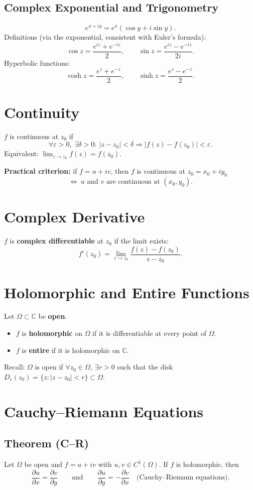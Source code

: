 \subsection{Complex Exponential and Trigonometry}
\[
e^{x+iy}=e^x(\cos y+i\sin y).
\]
Definitions (via the exponential, consistent with Euler’s formula):
\[
\cos z=\frac{e^{iz}+e^{-iz}}{2},\qquad
\sin z=\frac{e^{iz}-e^{-iz}}{2i}.
\]
Hyperbolic functions:
\[
\cosh z=\frac{e^z+e^{-z}}{2},\qquad
\sinh z=\frac{e^z-e^{-z}}{2}.
\]

\section{Continuity}
$f$ is continuous at $z_0$ if
\[
\forall \varepsilon>0,\;\exists \delta>0:\ |z-z_0|<\delta \Rightarrow |f(z)-f(z_0)|<\varepsilon.
\]
Equivalent: $\lim_{z\to z_0} f(z)=f(z_0)$.

\textbf{Practical criterion:} if $f=u+iv$, then $f$ is continuous at $z_0=x_0+iy_0$
\[
\Longleftrightarrow\ u \text{ and } v \text{ are continuous at } (x_0,y_0).
\]

\section{Complex Derivative}
$f$ is \textbf{complex differentiable} at $z_0$ if the limit exists:
\[
f'(z_0)=\lim_{z\to z_0}\frac{f(z)-f(z_0)}{z-z_0}.
\]

\section{Holomorphic and Entire Functions}
Let $\Omega\subset\mathbb{C}$ be \textbf{open}.
\begin{itemize}
\item $f$ is \textbf{holomorphic} on $\Omega$ if it is differentiable at every point of $\Omega$.
\item $f$ is \textbf{entire} if it is holomorphic on $\mathbb{C}$.
\end{itemize}
Recall: $\Omega$ is open if $\forall z_0\in\Omega,\ \exists r>0$ such that the disk
$D_r(z_0)=\{z:|z-z_0|<r\}\subset\Omega$.


\section{Cauchy--Riemann Equations}

\subsection{Theorem (C--R)}
Let $\Omega$ be open and $f=u+iv$ with $u,v\in C^1(\Omega)$.
If $f$ is holomorphic, then
\[
\boxed{\frac{\partial u}{\partial x}=\frac{\partial v}{\partial y}
\qquad\text{and}\qquad
\frac{\partial u}{\partial y}=-\frac{\partial v}{\partial x}}
\quad\text{(Cauchy--Riemann equations).}
\]

